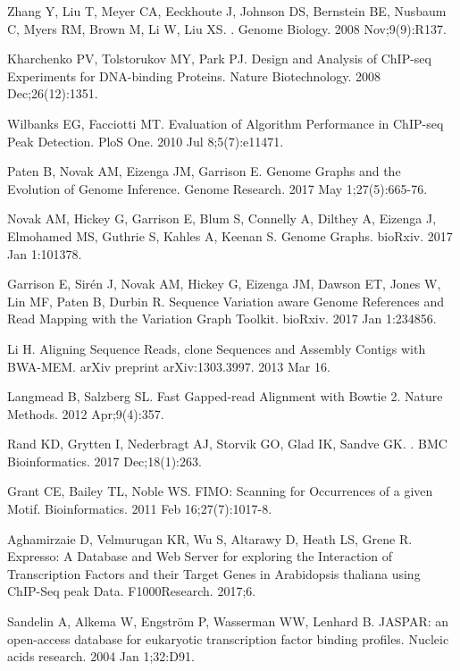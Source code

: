 \documentclass[10pt,letterpaper]{article}
\begin{document}
\begin{thebibliography}{10}


Zhang Y, Liu T, Meyer CA, Eeckhoute J, Johnson DS, Bernstein BE, Nusbaum C, Myers RM, Brown M, Li W, Liu XS. 
. 
\newblock Genome Biology. 2008 Nov;9(9):R137.

Kharchenko PV, Tolstorukov MY, Park PJ. Design and Analysis of ChIP-seq Experiments for DNA-binding Proteins. Nature Biotechnology. 2008 Dec;26(12):1351.

Wilbanks EG, Facciotti MT. Evaluation of Algorithm Performance in ChIP-seq Peak Detection. PloS One. 2010 Jul 8;5(7):e11471.

Paten B, Novak AM, Eizenga JM, Garrison E. Genome Graphs and the Evolution of Genome Inference. Genome Research. 2017 May 1;27(5):665-76.

Novak AM, Hickey G, Garrison E, Blum S, Connelly A, Dilthey A, Eizenga J, Elmohamed MS, Guthrie S, Kahles A, Keenan S. Genome Graphs. bioRxiv. 2017 Jan 1:101378.


Garrison E, Sirén J, Novak AM, Hickey G, Eizenga JM, Dawson ET, Jones W, Lin MF, Paten B, Durbin R. Sequence Variation aware Genome References and Read Mapping with the Variation Graph Toolkit. bioRxiv. 2017 Jan 1:234856.


Li H. Aligning Sequence Reads, clone Sequences and Assembly Contigs with BWA-MEM. arXiv preprint arXiv:1303.3997. 2013 Mar 16.

Langmead B, Salzberg SL. Fast Gapped-read Alignment with Bowtie 2. Nature Methods. 2012 Apr;9(4):357.

Rand KD, Grytten I, Nederbragt AJ, Storvik GO, Glad IK, Sandve GK. 
. 
\newblock BMC Bioinformatics. 2017 Dec;18(1):263.

Grant CE, Bailey TL, Noble WS. FIMO: Scanning for Occurrences of a given Motif. Bioinformatics. 2011 Feb 16;27(7):1017-8.

Aghamirzaie D, Velmurugan KR, Wu S, Altarawy D, Heath LS, Grene R. Expresso: A Database and Web Server for exploring the Interaction of Transcription Factors and their Target Genes in Arabidopsis thaliana using ChIP-Seq peak Data. F1000Research. 2017;6.

Sandelin A, Alkema W, {Engström} P, Wasserman WW, Lenhard B. 
JASPAR: an open\--access database for eukaryotic transcription factor binding profiles. Nucleic acids research. 2004 Jan 1;32:D91.


\end{thebibliography}
\end{document}
